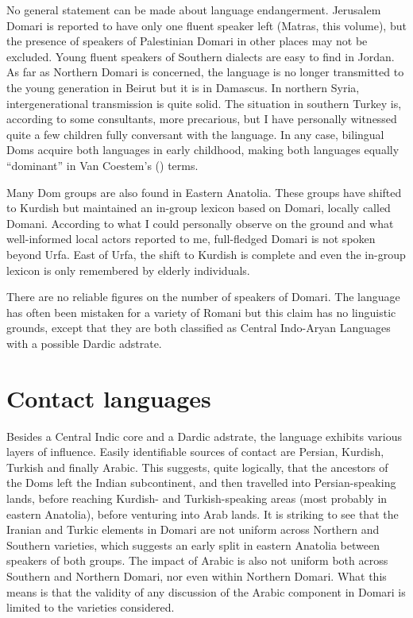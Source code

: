 \documentclass[output=paper]{langsci/langscibook}
\begin{document}
No general statement can be made about language endangerment. Jerusalem Domari is reported to have only one fluent speaker left (Matras, this volume), but the presence of speakers of Palestinian Domari in other places may not be excluded. Young fluent speakers of Southern dialects are easy to find in Jordan. As far as Northern Domari is concerned, the language is no longer transmitted to the young generation in Beirut but it is in Damascus. In northern Syria, intergenerational transmission is quite solid. The situation in southern Turkey is, according to some consultants, more precarious, but I have personally witnessed quite a few children fully conversant with the language. In any case, bilingual Doms acquire both languages in early childhood, making both languages equally “dominant” in Van Coestem’s (\citeyear{VanCoetsem1988,VanCoetsem2000}) terms.

Many Dom groups are also found in Eastern Anatolia. These groups have shifted to Kurdish but maintained an in-group lexicon based on Domari, locally called Domani. According to what I could personally observe on the ground and what well-informed local actors reported to me, full-fledged Domari is not spoken beyond Urfa. East of Urfa, the shift to Kurdish is complete and even the in-group lexicon is only remembered by elderly individuals. 

There are no reliable figures on the number of speakers of Domari. The language has often been mistaken for a variety of Romani but this claim has no linguistic grounds, except that they are both classified as Central Indo-Aryan Languages with a possible Dardic adstrate.
\largerpage
\section{Contact languages}

Besides a Central Indic core and a Dardic adstrate, the language exhibits various layers of influence. Easily identifiable sources of contact are Persian, Kurdish, Turkish and finally Arabic. This suggests, quite logically, that the ancestors of the Doms left the Indian subcontinent, and then travelled into Persian-speaking lands, before reaching Kurdish- and Turkish-speaking areas (most probably in eastern Anatolia), before venturing into Arab lands. It is striking to see that the Iranian and Turkic elements in Domari are not uniform across Northern and Southern varieties, which suggests an early split in eastern Anatolia between speakers of both groups. The impact of Arabic is also not uniform both across Southern and Northern Domari, nor even within Northern Domari. What this means is that the validity of any discussion of the Arabic component in Domari is limited to the varieties considered.
\end{document}
